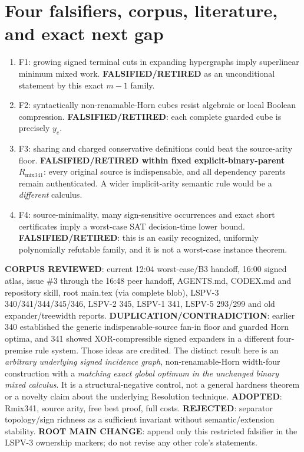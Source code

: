 \documentclass[11pt]{article}
\begin{document}
\section*{Four falsifiers, corpus, literature, and exact next gap}
\begin{enumerate}
\item[] F1: growing signed terminal cuts in expanding hypergraphs imply superlinear minimum mixed work. \textbf{FALSIFIED/RETIRED} as an unconditional statement by this exact $m-1$ family.
\item[] F2: syntactically non-renamable-Horn cubes resist algebraic or local Boolean compression. \textbf{FALSIFIED/RETIRED}: each complete guarded cube is precisely $y_e$.
\item[] F3: sharing and charged conservative definitions could beat the source-arity floor. \textbf{FALSIFIED/RETIRED within fixed explicit-binary-parent $R_{\mathrm{mix341}}$}: every original source is indispensable, and all dependency parents remain authenticated. A wider implicit-arity semantic rule would be a \emph{different} calculus.
\item[] F4: source-minimality, many sign-sensitive occurrences and exact short certificates imply a worst-case SAT decision-time lower bound. \textbf{FALSIFIED/RETIRED}: this is an easily recognized, uniformly polynomially refutable family, and it is not a worst-case instance theorem.
\end{enumerate}
\noindent\textbf{CORPUS REVIEWED}: current 12:04 worst-case/B3 handoff, 16:00 signed atlas, issue \#3 through the 16:48 peer handoff, AGENTS.md, CODEX.md and repository skill, root main.tex (via complete blob), LSPV-3 340/341/344/345/346, LSPV-2 345, LSPV-1 341, LSPV-5 293/299 and old expander/treewidth reports. \textbf{DUPLICATION/CONTRADICTION}: earlier 340 established the generic indispensable-source fan-in floor and guarded Horn optima, and 341 showed XOR-compressible signed expanders in a different four-premise rule system. Those ideas are credited. The distinct result here is an \emph{arbitrary underlying signed incidence graph}, non-renamable-Horn width-four construction with a \emph{matching exact global optimum in the unchanged binary mixed calculus}. It is a structural-negative control, not a general hardness theorem or a novelty claim about the underlying Resolution technique. \textbf{ADOPTED}: Rmix341, source arity, free best proof, full costs. \textbf{REJECTED}: separator topology/sign richness as a sufficient invariant without semantic/extension stability. \textbf{ROOT MAIN CHANGE}: append only this restricted falsifier in the LSPV-3 ownership markers; do not revise any other role's statements.
\end{document}

